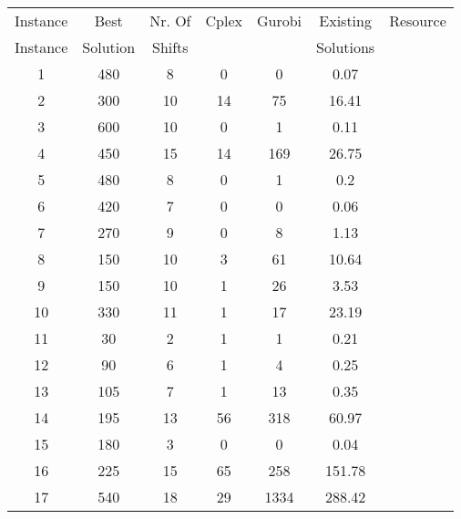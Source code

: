 \begin{table} \small
\centering
\begin{tabular}{ccccccc}
\hline
 Instance & Best  & Nr. Of  & Cplex & Gurobi  & Existing  & Resource \\
 Instance & Solution & Shifts &  &   & Solutions &  \\
\hline
1 &  480	& 8 & 0 & 0 & 0.07 & \cite{li:2007:gaspero}\\

2 &  300	& 10 & 14 & 75 & 16.41 & \cite{li:2007:gaspero} \\

3 &  600 	& 10 & 0 & 1 & 0.11 & \cite{li:2007:gaspero}  \\

4 &  450	& 15 & 14 & 169 & 26.75 & \cite{li:2010:abseher} \\

5 &  480	& 8 & 0 & 1 & 0.2  &  \cite{li:2007:gaspero}\\

6 &  420	& 7 & 0 & 0 & 0.06 & \cite{li:2007:gaspero}\\

7 &  270	& 9 & 0 & 8 & 1.13 & \cite{li:2007:gaspero}\\

8 &   150	& 10 & 3 & 61 & 10.64 & \cite{li:2007:gaspero}\\

9 &  150	& 10 & 1 & 26 & 3.53 & \cite{li:2007:gaspero}\\

10&  330	& 11 & 1 & 17 &  23.19 &  \cite{li:2010:abseher} \\

11 &  30	& 2 & 1 & 1 &0.21 & \cite{li:2007:gaspero}\\

12 &  90	& 6 & 1 & 4 &0.25 & \cite{li:2007:gaspero}\\

13 &  105 	& 7 & 1 & 13  & 0.35 &  \cite{li:2007:gaspero}\\

14 &  195	& 13 & 56 & 318 & 60.97 & \cite{li:2007:gaspero}\\

15 &  180	& 3 & 0 & 0  & 0.04  &\cite{li:2007:gaspero} \\

16 &  225	& 15 & 65 &  258 & 151.78 & \cite{li:2007:gaspero} \\

17 &  540	& 18 & 29 & 1334   & 288.42 &\cite{li:2007:gaspero}\\


\end{tabular}
\end{table}
